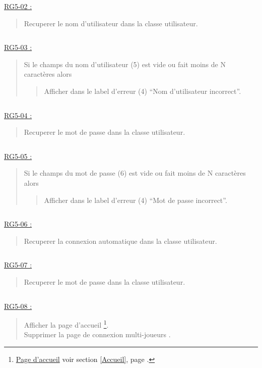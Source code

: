 \documentclass{report}
\begin{document}
			$\,$
			
			\underline{RG5-02 :}
				\begin{quote}
					Recuperer le nom d'utilisateur dans la classe utilisateur.
				\end{quote}

			$\,$
			
			\underline{RG5-03 :}
				\begin{quote}
					Si le champs du nom d'utilisateur (5) est vide ou fait moins de N caractères alors
					\begin{quote}
						Afficher dans le label d'erreur (4) ``Nom d'utilisateur incorrect''.
					\end{quote}
				\end{quote}

			$\,$
			
			\underline{RG5-04 :}
				\begin{quote}
					Recuperer le mot de passe dans la classe utilisateur.
				\end{quote}
				
			$\,$
			
			\underline{RG5-05 :}
				\begin{quote}
					Si le champs du mot de passe (6) est vide ou fait moins de N caractères alors
					\begin{quote}
						Afficher dans le label d'erreur (4) ``Mot de passe incorrect''.
					\end{quote}
				\end{quote}

			$\,$
			
			\underline{RG5-06 :}
				\begin{quote}
					Recuperer la connexion automatique dans la classe utilisateur.
				\end{quote}
				
			$\,$
			
			\underline{RG5-07 :}
				\begin{quote}
					Recuperer le mot de passe dans la classe utilisateur.
				\end{quote}

			$\,$

			\underline{RG5-08 :}
				\begin{quote}
					Afficher la page d'accueil%
						\footnote[3]{
							\hyperlink{Page d'accueil}{Page d'accueil}
							\og voir section \ref{Accueil}, page \pageref{Accueil}.\fg
						}.\\
					Supprimer la page de connexion multi-joueurs \footnotemark[2].		
				\end{quote}	
\end{document}
